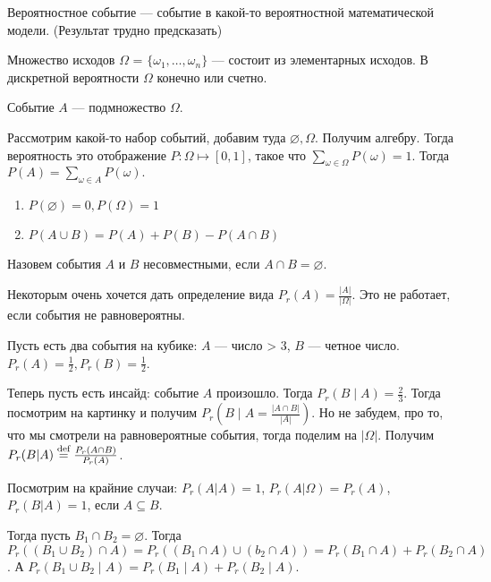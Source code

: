 Вероятностное событие --- событие в какой-то вероятностной математической модели. (Результат трудно предсказать)

Множество исходов $\Omega$ =  $\{\omega_1, \ldots, \omega_n\}$ --- состоит из элементарных исходов. В дискретной вероятности $\Omega$ конечно или счетно. 

Событие $A$ --- подмножество  $\Omega$. 

Рассмотрим какой-то набор событий, добавим туда  $\varnothing, \Omega$. Получим алгебру. Тогда вероятность это отображение  $P: \Omega \mapsto [0, 1]$, такое что  $\sum_{\omega \in \Omega} P(\omega)=1$. Тогда  $P(A) = \sum_{\omega \in A} P(\omega).$
\begin{enumerate}[]
    \item $P(\varnothing) = 0, P(\Omega) = 1$
    \item  $P(A \cup B) = P(A) + P(B) - P(A \cap B)$
\end{enumerate}
 \begin{definition}
    Назовем события $A$ и  $B$ несовместными, если  $A \cap B = \varnothing$.
\end{definition}
\slashn 
Некоторым очень хочется дать определение вида $P_r(A) = \frac{|A|}{|\Omega|}$. Это не работает, если события не равновероятны. 

Пусть есть два события на кубике: $A$ --- число > 3,  $B$ --- четное число.  $P_r(A) = \frac{1}{2}, P_r(B) = \frac{1}{2}$.

Теперь пусть есть инсайд: событие $A$ произошло. Тогда  $P_r(B \mid A) = \frac{2}{3}$. Тогда посмотрим на картинку и получим $P_r(B \mid A = \frac{|A \cap B|}{|A|})$. Но не забудем, про то, что мы смотрели на равновероятные события, тогда поделим на $|\Omega|$. Получим  $P_r(B|A) \stackrel{\text{def}}{=} \frac{P_r(A \cap B)}{P_r(A)}$.

Посмотрим на крайние случаи: $P_r(A | A) = 1$,  $P_r(A | \Omega) = P_r(A)$,  $P_r(B|A) = 1$, если  $A \subseteq B$.

Тогда пусть $B_1 \cap B_2 = \varnothing$. Тогда  $P_r((B_1 \cup B_2) \cap A) = P_r((B_1 \cap A) \cup (b_2 \cap A)) = P_r(B_1 \cap A) + P_r(B_2 \cap A)$. А $P_r(B_1 \cup B_2 \mid A) = P_r(B_1 \mid A) + P_r(B_2 \mid A)$.

